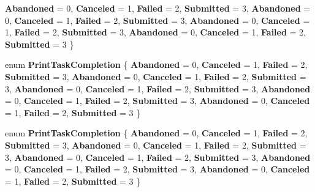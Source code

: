 \begin{DoxyCompactItemize}
\newline
{\bfseries Abandoned} = 0, 
{\bfseries Canceled} = 1, 
{\bfseries Failed} = 2, 
{\bfseries Submitted} = 3, 
\newline
{\bfseries Abandoned} = 0, 
{\bfseries Canceled} = 1, 
{\bfseries Failed} = 2, 
{\bfseries Submitted} = 3, 
\newline
{\bfseries Abandoned} = 0, 
{\bfseries Canceled} = 1, 
{\bfseries Failed} = 2, 
{\bfseries Submitted} = 3, 
\newline
{\bfseries Abandoned} = 0, 
{\bfseries Canceled} = 1, 
{\bfseries Failed} = 2, 
{\bfseries Submitted} = 3
 \}
\item 
\mbox{\label{namespace_windows_1_1_graphics_1_1_printing_ad838d31091822f0e6a5be87e27a87561}} 
enum {\bfseries Print\+Task\+Completion} \{ \newline
{\bfseries Abandoned} = 0, 
{\bfseries Canceled} = 1, 
{\bfseries Failed} = 2, 
{\bfseries Submitted} = 3, 
\newline
{\bfseries Abandoned} = 0, 
{\bfseries Canceled} = 1, 
{\bfseries Failed} = 2, 
{\bfseries Submitted} = 3, 
\newline
{\bfseries Abandoned} = 0, 
{\bfseries Canceled} = 1, 
{\bfseries Failed} = 2, 
{\bfseries Submitted} = 3, 
\newline
{\bfseries Abandoned} = 0, 
{\bfseries Canceled} = 1, 
{\bfseries Failed} = 2, 
{\bfseries Submitted} = 3, 
\newline
{\bfseries Abandoned} = 0, 
{\bfseries Canceled} = 1, 
{\bfseries Failed} = 2, 
{\bfseries Submitted} = 3
 \}
\item 
\mbox{\label{namespace_windows_1_1_graphics_1_1_printing_ad838d31091822f0e6a5be87e27a87561}} 
enum {\bfseries Print\+Task\+Completion} \{ \newline
{\bfseries Abandoned} = 0, 
{\bfseries Canceled} = 1, 
{\bfseries Failed} = 2, 
{\bfseries Submitted} = 3, 
\newline
{\bfseries Abandoned} = 0, 
{\bfseries Canceled} = 1, 
{\bfseries Failed} = 2, 
{\bfseries Submitted} = 3, 
\newline
{\bfseries Abandoned} = 0, 
{\bfseries Canceled} = 1, 
{\bfseries Failed} = 2, 
{\bfseries Submitted} = 3, 
\newline
{\bfseries Abandoned} = 0, 
{\bfseries Canceled} = 1, 
{\bfseries Failed} = 2, 
{\bfseries Submitted} = 3, 
\newline
{\bfseries Abandoned} = 0, 
{\bfseries Canceled} = 1, 
{\bfseries Failed} = 2, 
{\bfseries Submitted} = 3
 \}
\end{DoxyCompactItemize}
